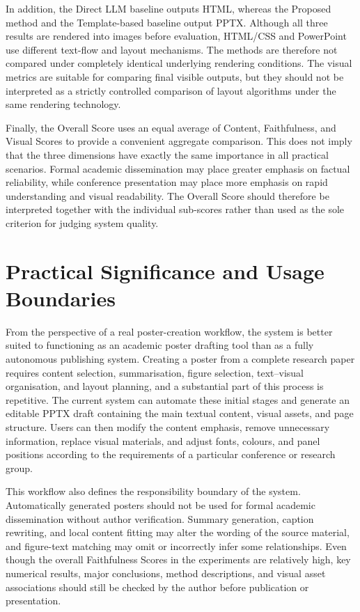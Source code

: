 \documentclass[12pt,oneside]{report}
\begin{document}
\vspace{1em}

In addition, the Direct LLM baseline outputs HTML, whereas the Proposed method and the Template-based baseline output PPTX. Although all three results are rendered into images before evaluation, HTML/CSS and PowerPoint use different text-flow and layout mechanisms. The methods are therefore not compared under completely identical underlying rendering conditions. The visual metrics are suitable for comparing final visible outputs, but they should not be interpreted as a strictly controlled comparison of layout algorithms under the same rendering technology.

\vspace{1em}

Finally, the Overall Score uses an equal average of Content, Faithfulness, and Visual Scores to provide a convenient aggregate comparison. This does not imply that the three dimensions have exactly the same importance in all practical scenarios. Formal academic dissemination may place greater emphasis on factual reliability, while conference presentation may place more emphasis on rapid understanding and visual readability. The Overall Score should therefore be interpreted together with the individual sub-scores rather than used as the sole criterion for judging system quality.

\section{Practical Significance and Usage Boundaries}

From the perspective of a real poster-creation workflow, the system is better suited to functioning as an academic poster drafting tool than as a fully autonomous publishing system. Creating a poster from a complete research paper requires content selection, summarisation, figure selection, text--visual organisation, and layout planning, and a substantial part of this process is repetitive. The current system can automate these initial stages and generate an editable PPTX draft containing the main textual content, visual assets, and page structure. Users can then modify the content emphasis, remove unnecessary information, replace visual materials, and adjust fonts, colours, and panel positions according to the requirements of a particular conference or research group.

\vspace{1em}

This workflow also defines the responsibility boundary of the system. Automatically generated posters should not be used for formal academic dissemination without author verification. Summary generation, caption rewriting, and local content fitting may alter the wording of the source material, and figure-text matching may omit or incorrectly infer some relationships. Even though the overall Faithfulness Scores in the experiments are relatively high, key numerical results, major conclusions, method descriptions, and visual asset associations should still be checked by the author before publication or presentation.
\end{document}
